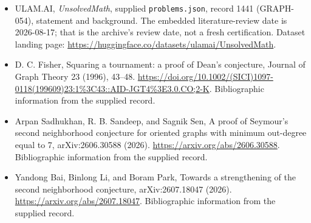 \documentclass[11pt,a4paper]{article}
\begin{document}
{\small

\begin{itemize}

\item[\hypertarget{source:1441:1}{S1}] ULAM.AI, \emph{UnsolvedMath}, supplied \texttt{problems.json}, record 1441 (GRAPH-054), statement and background. The embedded literature-review date is 2026-08-17; that is the archive’s review date, not a fresh certification. Dataset landing page: \url{https://huggingface.co/datasets/ulamai/UnsolvedMath}.

\item[\hypertarget{source:1441:2}{S2}] D. C. Fisher, Squaring a tournament: a proof of Dean's conjecture, Journal of Graph Theory 23 (1996), 43–48. \url{https://doi.org/10.1002/(SICI)1097-0118(199609)23:1%3C43::AID-JGT4%3E3.0.CO;2-K}. Bibliographic information from the supplied record.

\item[\hypertarget{source:1441:3}{S3}] Arpan Sadhukhan, R. B. Sandeep, and Sagnik Sen, A proof of Seymour's second neighborhood conjecture for oriented graphs with minimum out-degree equal to 7, arXiv:2606.30588 (2026). \url{https://arxiv.org/abs/2606.30588}. Bibliographic information from the supplied record.

\item[\hypertarget{source:1441:4}{S4}] Yandong Bai, Binlong Li, and Boram Park, Towards a strengthening of the second neighborhood conjecture, arXiv:2607.18047 (2026). \url{https://arxiv.org/abs/2607.18047}. Bibliographic information from the supplied record.

\end{itemize}

}

\label{end:1441}
\end{document}
